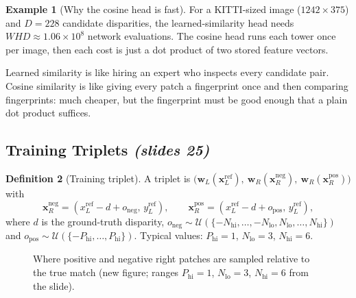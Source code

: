 \documentclass[11pt,a4paper]{article}
\newcommand{\slr}[1]{\texorpdfstring{\emph{(slides #1)}}{(slides #1)}}
\newcommand{\wL}{\bm{w}_L}
\newcommand{\wR}{\bm{w}_R}
\newcommand{\x}{{\bm{x}}}
\theoremstyle{definition}
\newtheorem{definition}{Definition}[section]
\newtheorem{example}[definition]{Example}
\theoremstyle{plain}
\theoremstyle{remark}
\begin{document}
\begin{example}[Why the cosine head is fast]
For a KITTI-sized image ($1242\times375$) and $D=228$ candidate disparities, the learned-similarity head needs $WHD\approx1.06\times10^{8}$ network evaluations. The cosine head runs each tower once per image, then each cost is just a dot product of two stored feature vectors.
\end{example}
\begin{intuition}
Learned similarity is like hiring an expert who inspects every candidate pair. Cosine similarity is like giving every patch a fingerprint once and then comparing fingerprints: much cheaper, but the fingerprint must be good enough that a plain dot product suffices.
\end{intuition}

\subsection{Training Triplets \slr{25}}
\begin{definition}[Training triplet]
A triplet is $\bigl(\wL(\bm x_L^{\mathrm{ref}}),\ \wR(\bm x_R^{\mathrm{neg}}),\ \wR(\bm x_R^{\mathrm{pos}})\bigr)$ with
\[
\bm x_R^{\mathrm{neg}}=(x_L^{\mathrm{ref}}-d+o_{\mathrm{neg}},\,y_L^{\mathrm{ref}}),\qquad
\bm x_R^{\mathrm{pos}}=(x_L^{\mathrm{ref}}-d+o_{\mathrm{pos}},\,y_L^{\mathrm{ref}}),
\]
where $d$ is the ground-truth disparity, $o_{\mathrm{neg}}\sim\mathcal U(\{-N_{\mathrm{hi}},\dots,-N_{\mathrm{lo}},N_{\mathrm{lo}},\dots,N_{\mathrm{hi}}\})$ and $o_{\mathrm{pos}}\sim\mathcal U(\{-P_{\mathrm{hi}},\dots,P_{\mathrm{hi}}\})$. Typical values: $P_{\mathrm{hi}}=1$, $N_{\mathrm{lo}}=3$, $N_{\mathrm{hi}}=6$.
\end{definition}
\begin{figure}[H]\centering
{}
\caption{Where positive and negative right patches are sampled relative to the true match (new figure; ranges $P_{\mathrm{hi}}=1$, $N_{\mathrm{lo}}=3$, $N_{\mathrm{hi}}=6$ from the slide).}
\end{figure}
\end{document}
